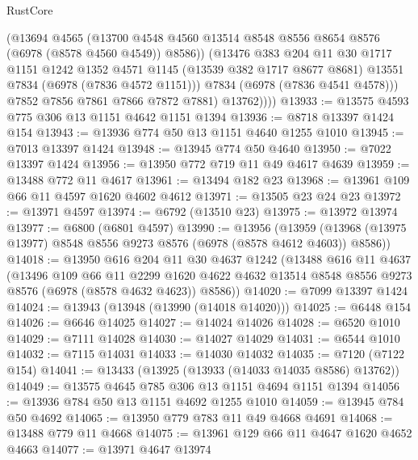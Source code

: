 \begin{lexlean}{RustCore}
\begin{coremodule}
                (@13694
                  @4565
                  (@13700
                    @4548
                    @4560
                    @13514
                    @8548
                    @8556
                    @8654
                    @8576
                    (@6978 (@8578 @4560 @4549))
                    @8586))
                (@13476
                  @383
                  @204
                  @11
                  @30
                  @1717
                  @1151
                  @1242
                  @1352
                  @4571
                  @1145
                  (@13539 @382 @1717 @8677 @8681)
                  @13551
                  @7834
                  (@6978 (@7836 @4572 @1151)))
                @7834
                (@6978 (@7836 @4541 @4578)))
              @7852
              @7856
              @7861
              @7866
              @7872
              @7881)
            @13762))))
@13933 := @13575 @4593 @775 @306 @13 @1151 @4642 @1151 @1394
@13936 := @8718 @13397 @1424 @154
@13943 := @13936 @774 @50 @13 @1151 @4640 @1255 @1010
@13945 := @7013 @13397 @1424
@13948 := @13945 @774 @50 @4640
@13950 := @7022 @13397 @1424
@13956 := @13950 @772 @719 @11 @49 @4617 @4639
@13959 := @13488 @772 @11 @4617
@13961 := @13494 @182 @23
@13968 := @13961 @109 @66 @11 @4597 @1620 @4602 @4612
@13971 := @13505 @23 @24 @23
@13972 := @13971 @4597
@13974 := @6792 (@13510 @23)
@13975 := @13972 @13974
@13977 := @6800 (@6801 @4597)
@13990 := @13956
    (@13959 (@13968 (@13975 @13977) @8548 @8556 @9273 @8576 (@6978 (@8578 @4612 @4603)) @8586))
@14018 := @13950
    @616
    @204
    @11
    @30
    @4637
    @1242
    (@13488
      @616
      @11
      @4637
      (@13496
        @109
        @66
        @11
        @2299
        @1620
        @4622
        @4632
        @13514
        @8548
        @8556
        @9273
        @8576
        (@6978 (@8578 @4632 @4623))
        @8586))
@14020 := @7099 @13397 @1424
@14024 := @13943 (@13948 (@13990 (@14018 @14020)))
@14025 := @6448 @154
@14026 := @6646 @14025
@14027 := @14024 @14026
@14028 := @6520 @1010
@14029 := @7111 @14028
@14030 := @14027 @14029
@14031 := @6544 @1010
@14032 := @7115 @14031
@14033 := @14030 @14032
@14035 := @7120 (@7122 @154)
@14041 := @13433 (@13925 (@13933 (@14033 @14035 @8586) @13762))
@14049 := @13575 @4645 @785 @306 @13 @1151 @4694 @1151 @1394
@14056 := @13936 @784 @50 @13 @1151 @4692 @1255 @1010
@14059 := @13945 @784 @50 @4692
@14065 := @13950 @779 @783 @11 @49 @4668 @4691
@14068 := @13488 @779 @11 @4668
@14075 := @13961 @129 @66 @11 @4647 @1620 @4652 @4663
@14077 := @13971 @4647 @13974

\end{coremodule}
\end{lexlean}
